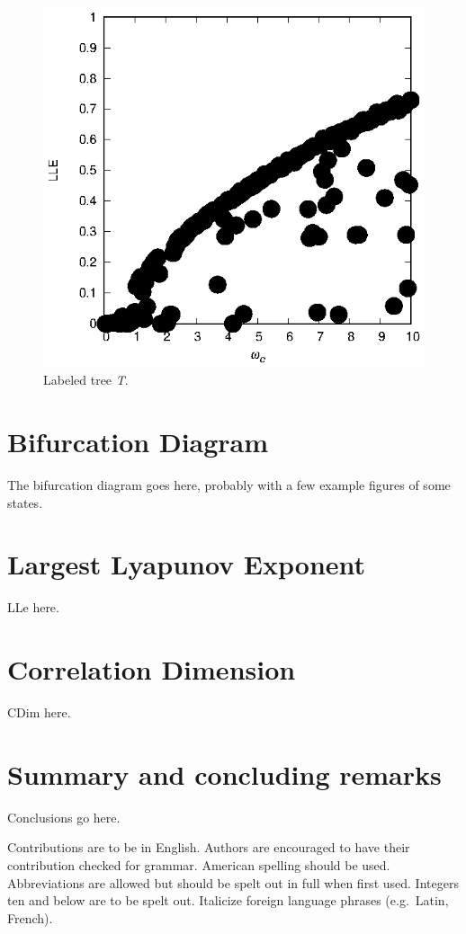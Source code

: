 \documentclass{ws-ijbc}
\begin{document}
\begin{figure}[htbp]
\begin{center}
\includegraphics[width=0.5\linewidth]{lle2.eps}
\end{center}
\caption{Labeled tree {\it T}.}
\label{fig.lle2}
\end{figure}




\section{Bifurcation Diagram}
\label{sec.bi}

The bifurcation diagram goes here, probably with a few example figures of some states. 


\section{Largest Lyapunov Exponent}
\label{sec.lle}

LLe here. 


\section{Correlation Dimension}
\label{sec.dim}

CDim here. 


\section{Summary and concluding remarks}
\label{sec.conc}

Conclusions go here. 




\noindent Contributions are to be in English. Authors are
encouraged to have their contribution checked for grammar.
American spelling should be used. Abbreviations are allowed but
should be spelt out in full when first used. Integers ten and
below are to be spelt out. Italicize foreign language phrases
(e.g.~Latin, French).
\end{document}
